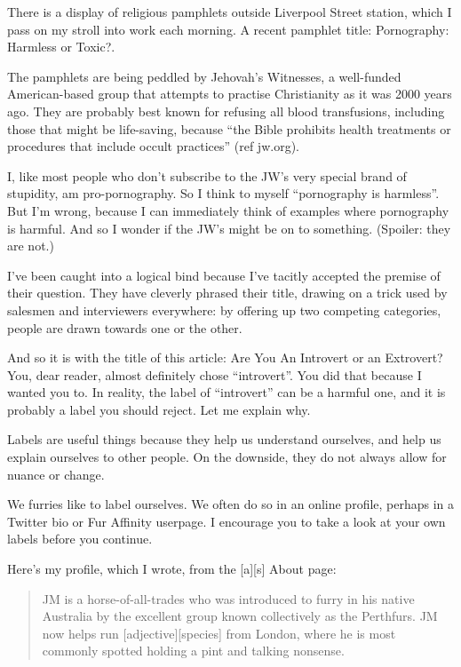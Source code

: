 There is a display of religious pamphlets outside Liverpool Street station, which I pass on my stroll into work each morning. A recent pamphlet title: Pornography: Harmless or Toxic?.

The pamphlets are being peddled by Jehovah's Witnesses, a well-funded American-based group that attempts to practise Christianity as it was 2000 years ago. They are probably best known for refusing all blood transfusions, including those that might be life-saving, because ``the Bible prohibits health treatments or procedures that include occult practices'' (ref jw.org).

I, like most people who don't subscribe to the JW's very special brand of stupidity, am pro-pornography. So I think to myself ``pornography is harmless''. But I'm wrong, because I can immediately think of examples where pornography is harmful. And so I wonder if the JW's might be on to something. (Spoiler: they are not.)

I've been caught into a logical bind because I've tacitly accepted the premise of their question. They have cleverly phrased their title, drawing on a trick used by salesmen and interviewers everywhere: by offering up two competing categories, people are drawn towards one or the other.

And so it is with the title of this article: Are You An Introvert or an Extrovert? You, dear reader, almost definitely chose ``introvert''. You did that because I wanted you to. In reality, the label of ``introvert'' can be a harmful one, and it is probably a label you should reject. Let me explain why.

Labels are useful things because they help us understand ourselves, and help us explain ourselves to other people. On the downside, they do not always allow for nuance or change.

We furries like to label ourselves. We often do so in an online profile, perhaps in a Twitter bio or Fur Affinity userpage. I encourage you to take a look at your own labels before you continue.

Here's my profile, which I wrote, from the [a][s] About page:

\begin{quote}
  JM is a horse-of-all-trades who was introduced to furry in his native Australia by the excellent group known collectively as the Perthfurs. JM now helps run [adjective][species] from London, where he is most commonly spotted holding a pint and talking nonsense.
\end{quote}

